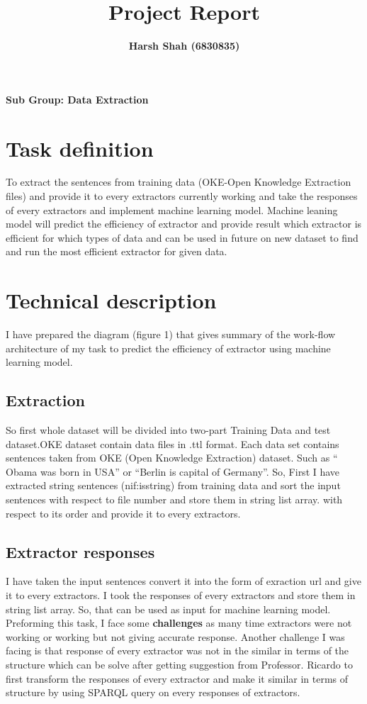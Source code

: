 \documentclass{llncs}
\title{Project Report}
\author{\textbf{Harsh Shah (6830835)}}
\institute{\textbf{Data Extraction, Search, Analysis and Benchmarking} }
\begin{document}
\maketitle %
\noindent \hfill \textbf{ Sub Group: Data Extraction}\hfill \ 





\section{Task definition}
To extract the sentences from training data (OKE-Open Knowledge Extraction files) and provide it to every extractors currently working and take the responses of every extractors and implement machine learning model. Machine leaning model will predict the efficiency of extractor and provide result which extractor is efficient for which types of  data and can be used in future on new dataset to find and run the most efficient  extractor for given data.\\
 




\section{Technical description}
I have prepared the diagram (figure 1) that gives  summary of the work-flow architecture of my task to predict the efficiency of extractor using machine learning model.


\subsection{Extraction}
So first whole dataset will be divided  into two-part Training Data and test dataset.OKE dataset contain data files in .ttl format. Each data set contains sentences taken from OKE (Open Knowledge Extraction) dataset. Such as “ Obama was born in USA” or “Berlin is capital of Germany”. So, First I have extracted string sentences (nif:isstring) from training data and sort the input sentences with respect to file number and store them in string list array. with respect to its order and provide it to every extractors.
\subsection{Extractor responses }
I have taken the input sentences convert it into the form of exraction url and give it to every extractors. I took the responses of every extractors and store them in string list array. So, that can be used as input for machine learning model. Preforming this task, I face some  \textbf{challenges} as many time extractors were not working or working but not giving accurate response. Another challenge I was facing is that response of every extractor was not in the similar in terms of the structure which can be solve after getting suggestion from Professor. Ricardo to first transform the responses of every extractor and make it similar in terms of structure by using SPARQL query on every responses of extractors.
\end{document}
